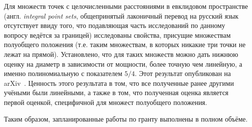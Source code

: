 \documentclass[a4paper,openbib]{report}
\theoremstyle{definition}
\begin{document}
Для множеств точек с целочисленными расстояниями в евклидовом пространстве
(англ. \textit{integral point sets}, общепринятый лаконичный перевод на русский язык отсутствует ввиду того,
что подавляющая часть исследований по данному вопросу ведётся за границей)
исследованы свойства, присущие множествам полуобщего положения
(т.е. таким множествам, в которых никакие три точки не лежат на прямой).
Установлено, что для таких множеств можно дать нижнюю оценку на диаметр в зависимости от мощности,
более точную чем линейную, а именно полиномиальную с показателем $5/4$.
Этот результат опубликован на arXiv~\cite{my-semi-general-5-4-bound-2019}.
Ценность этого результата в том, что все полученные ранее другими учёными
были линейными, а также в том, что полученная оценка является первой оценкой,
специфичной для множест полуобщего положения.



Таким образом, запланированные работы по гранту выполнены в полном объёме.




\small
\printbibliography{}
\end{document}

